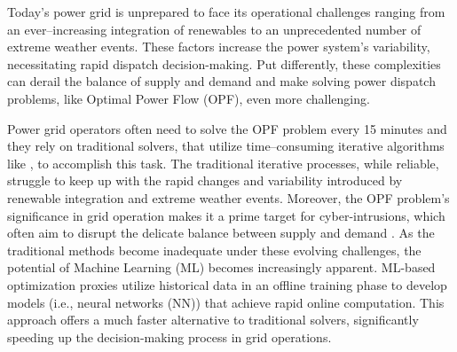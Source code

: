 

Today's power grid is unprepared to face its operational challenges ranging from an ever--increasing integration of renewables to an unprecedented number of extreme weather events. These factors increase the power system's variability, necessitating rapid dispatch decision-making. Put differently, these complexities can derail the balance of supply and demand and make solving power dispatch problems, like Optimal Power Flow (OPF), even more challenging.

Power grid operators often need to solve the OPF problem every 15 minutes and they rely on traditional solvers, that utilize time--consuming iterative algorithms like \cite{matpow2011, wachter2006interior}, to accomplish this task. %
The traditional iterative processes, while reliable, struggle to keep up with the rapid changes and variability introduced by renewable integration and extreme weather events. Moreover, the OPF problem's significance in grid operation makes it a prime target for cyber-intrusions, which often aim to disrupt the delicate balance between supply and demand \cite{Duan2018DataInteg, Rahman2014OPFAtt, Yang2017DataInteg}. As the traditional methods become inadequate under these evolving challenges, the potential of Machine Learning (ML) becomes increasingly apparent. ML-based optimization proxies utilize historical data in an offline training phase to develop models (i.e., neural networks (NN)) that achieve rapid online computation. This approach offers a much faster alternative to traditional solvers, significantly speeding up the decision-making process in grid operations.



